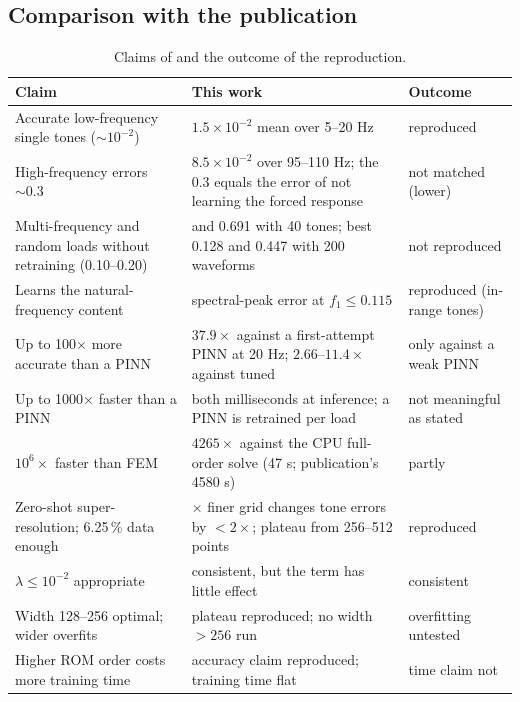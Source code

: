 \subsection*{Comparison with the publication}

\begin{table}[tbp]
\centering\footnotesize
\caption{Claims of \citet{yang2025frino} and the outcome of the reproduction.}\label{tab:vf-fr-cmp}
\begin{tabularx}{\linewidth}{@{}>{\raggedright\arraybackslash}p{4.2cm} >{\raggedright\arraybackslash}X >{\raggedright\arraybackslash}p{2.5cm}@{}}
\toprule
Claim & This work & Outcome\\
\midrule
Accurate low-frequency single tones ($\sim10^{-2}$) & $1.5\times10^{-2}$ mean over 5--20 Hz & reproduced\\
High-frequency errors $\sim0.3$ & $8.5\times10^{-2}$ over 95--110 Hz; the 0.3 equals the error of not learning the forced response & not matched (lower)\\
Multi-frequency and random loads without retraining (0.10--0.20) & 0.443 and 0.691 with 40 tones; best 0.128 and 0.447 with 200 waveforms & not reproduced\\
Learns the natural-frequency content & spectral-peak error at $f_1\le0.115$ & reproduced (in-range tones)\\
Up to 100$\times$ more accurate than a PINN & $37.9\times$ against a first-attempt PINN at 20 Hz; $2.66$--$11.4\times$ against tuned & only against a weak PINN\\
Up to 1000$\times$ faster than a PINN & both milliseconds at inference; a PINN is retrained per load & not meaningful as stated\\
$10^6\times$ faster than FEM & $4265\times$ against the CPU full-order solve (47 s; publication's 4580 s) & partly\\
Zero-shot super-resolution; 6.25\,\% data enough & 16$\times$ finer grid changes tone errors by $<2\times$; plateau from 256--512 points & reproduced\\
$\lambda\le10^{-2}$ appropriate & consistent, but the term has little effect & consistent\\
Width 128--256 optimal; wider overfits & plateau reproduced; no width $>256$ run & overfitting untested\\
Higher ROM order costs more training time & accuracy claim reproduced; training time flat & time claim not\\
\bottomrule
\end{tabularx}
\end{table}

